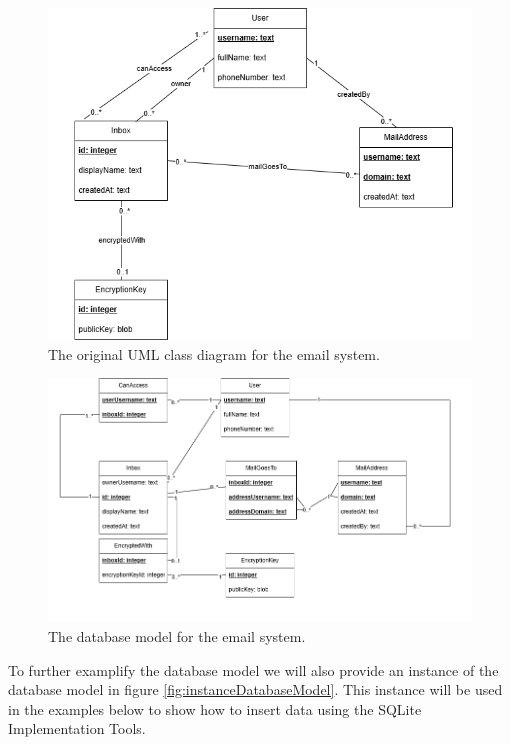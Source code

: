 \documentclass[a4paper,10pt,oneside]{article}
\begin{document}
\begin{figure}[h]
    \centering
    \includegraphics[width=1\textwidth]{model/original_uml_class_diagram.png}
    \caption{The original UML class diagram for the email system.}
    \label{fig:originalUMLClassDiagram}
\end{figure}

\begin{figure}[h]
    \centering
    \includegraphics[width=1\textwidth]{model/database_friendly.png}
    \caption{The database model for the email system.}
    \label{fig:originalDatabaseModel}
\end{figure}

To further examplify the database model we will also provide an instance of the database model in figure \ref{fig:instanceDatabaseModel}. This instance will be used in the examples below to show how to insert data using the SQLite Implementation Tools.
\end{document}
